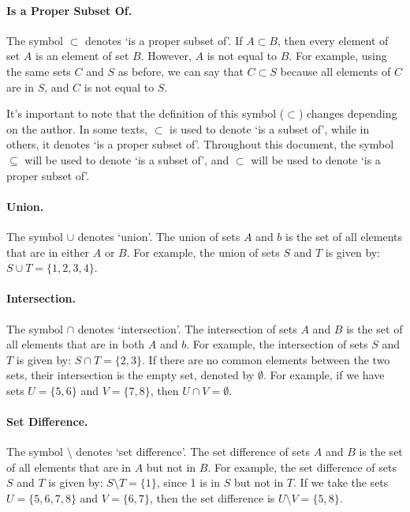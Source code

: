 \documentclass[a4paper, twoside]{article}
\begin{document}
\paragraph{Is a Proper Subset Of.} The symbol \(\subset\) denotes `is a proper subset of'. If \(A \subset B\), then every element of set \(A\) is an element of set \(B\). However, \(A\) is not equal to \(B\). For example, using the same sets \(C\) and \(S\) as before, we can say that \(C \subset S\) because all elements of \(C\) are in \(S\), and \(C\) is not equal to \(S\).

It's important to note that the definition of this symbol (\(\subset\)) changes depending on the author. In some texts, \(\subset\) is used to denote `is a subset of', while in others, it denotes `is a proper subset of'. Throughout this document, the symbol \(\subseteq\) will be used to denote `is a subset of', and \(\subset\) will be used to denote `is a proper subset of'.

\paragraph{Union.} The symbol \(\cup\) denotes `union'. The union of sets \(A\) and \(b\) is the set of all elements that are in either \(A\) or \(B\). For example, the union of sets \(S\) and \(T\) is given by: \( S \cup T = \{ 1, 2, 3, 4 \} \).

\paragraph{Intersection.} 
The symbol \(\cap\) denotes `intersection'. The intersection of sets \(A\) and \(B\) is the set of all elements that are in both \(A\) and \(b\). For example, the intersection of sets \(S\) and \(T\) is given by: \(S \cap T = \{ 2, 3 \}\). If there are no common elements between the two sets, their intersection is the empty set, denoted by \(\emptyset\). For example, if we have sets \(U = \{ 5, 6 \}\) and \(V = \{7, 8\}\), then \(U \cap V = \emptyset\).

\paragraph{Set Difference.}
The symbol \(\setminus\) denotes `set difference'. The set difference of sets \(A\) and \(B\) is the set of all elements that are in \(A\) but not in \(B\). For example, the set difference of sets \(S\) and \(T\) is given by: \(S \setminus T = \{1\}\), since 1 is in \(S\) but not in \(T\). If we take the sets \(U = \{ 5, 6, 7, 8 \}\) and \(V = \{ 6, 7\}\), then the set difference is \(U \setminus V = \{ 5, 8 \}\).
\end{document}
